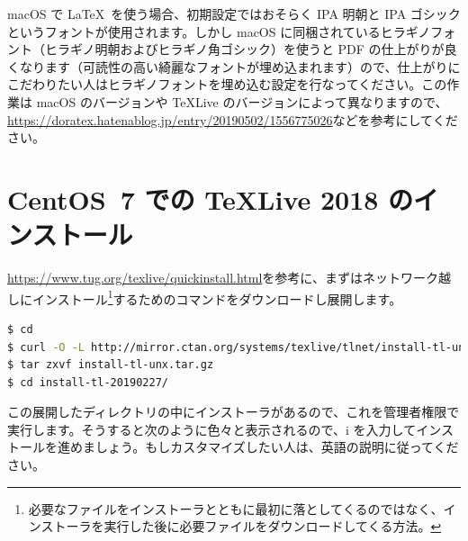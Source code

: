 macOS で \LaTeX\ を使う場合、初期設定ではおそらく IPA 明朝と IPA ゴシックというフォントが使用されます。しかし macOS に同梱されているヒラギノフォント（ヒラギノ明朝およびヒラギノ角ゴシック）を使うと PDF の仕上がりが良くなります（可読性の高い綺麗なフォントが埋め込まれます）ので、仕上がりにこだわりたい人はヒラギノフォントを埋め込む設定を行なってください。この作業は macOS のバージョンや TeXLive のバージョンによって異なりますので、\url{https://doratex.hatenablog.jp/entry/20190502/1556775026}などを参考にしてください。

\section{CentOS~7 での TeXLive 2018 のインストール}

\url{https://www.tug.org/texlive/quickinstall.html}を参考に、まずはネットワーク越しにインストール\footnote{必要なファイルをインストーラとともに最初に落としてくるのではなく、インストーラを実行した後に必要ファイルをダウンロードしてくる方法。}するためのコマンドをダウンロードし展開します。

\begin{lstlisting}[language=bash]
$ cd
$ curl -O -L http://mirror.ctan.org/systems/texlive/tlnet/install-tl-unx.tar.gz
$ tar zxvf install-tl-unx.tar.gz
$ cd install-tl-20190227/
\end{lstlisting}

この展開したディレクトリの中にインストーラがあるので、これを管理者権限で実行します。そうすると次のように色々と表示されるので、i を入力してインストールを進めましょう。もしカスタマイズしたい人は、英語の説明に従ってください。

